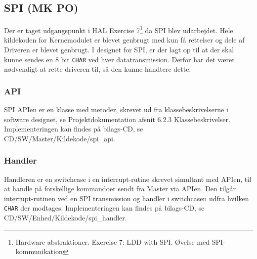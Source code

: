 \subsection{SPI (MK PO)}

Der er taget udgangspunkt i HAL Exercise 7\footnote{Hardware abstraktioner. Exercise 7: LDD with SPI. Øvelse med SPI-kommunikation} da SPI blev udarbejdet. Hele kildekoden for Kernemodulet er blevet genbrugt med kun få rettelser og dele af Driveren er blevet genbrugt. I designet for SPI, er der lagt op til at der skal kunne sendes en 8 bit \verb+CHAR+ ved hver datatransmission. Derfor har det været nødvendigt at rette driveren til, så den kunne håndtere dette.

\subsubsection*{API}

SPI APIen er en klasse med metoder, skrevet ud fra klassebeskrivelserne i software designet, se Projektdokumentation afsnit 6.2.3 Klassebeskrivelser. Implementeringen kan findes på bilags-CD, se CD/SW/Master/Kildekode/spi\_api.

\subsubsection*{Handler}

Handleren er en switchcase i en interrupt-rutine skrevet simultant med APIen, til at handle på forskellige kommandoer sendt fra Master via APIen. Den tilgår interrupt-rutinen ved en SPI transmission og handler i switchcasen udfra hvilken \verb+CHAR+ der modtages. Implementeringen kan findes på bilags-CD, se CD/SW/Enhed/Kildekode/spi\_handler.